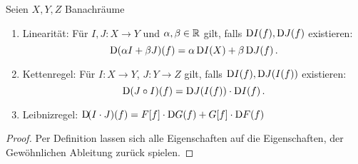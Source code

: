 \begin{lemma}
Seien $X,Y,Z$ Banachräume
\begin{enumerate}
  \item Linearität: Für $I,J:X\to Y$ und $\alpha,\beta\in\mathbb{R}$ gilt, falls
  $\Dif I (f),\Dif J(f)$ existieren:
  \begin{equation}
  \Dif\, (\alpha I+\beta J)(f)=\alpha\Dif I (X)+\beta\Dif J(f)\,.
  \end{equation}  
  \item Kettenregel: 
  Für $I:X\to Y$, $J:Y\to Z$ gilt, falls
  $\Dif I (f),\Dif J(I(f))$ existieren:
\begin{equation}
\Dif\, (J\circ
I)(f)=\Dif J (I(f))\cdot \Dif I(f)\,.
\end{equation}
  \item Leibnizregel: $\Dif (I\cdot J)(f)=F[f]\cdot \Dif G(f)+G[f]\cdot
  \Dif F(f)$
\end{enumerate}
\end{lemma}
\begin{proof}
Per Definition lassen sich alle Eigenschaften auf die Eigenschaften, der
Gewöhnlichen Ableitung zurück spielen.
\end{proof}
